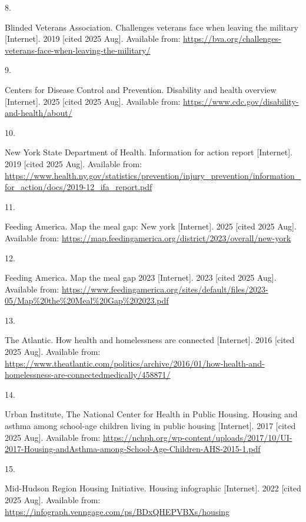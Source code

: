 \documentclass[
  english,
  letterpaper,
]{report}
\newlength{\cslhangindent}
\newlength{\csllabelwidth}
\newenvironment{CSLReferences}[2] %
 {\begin{list}{}{%
  \setlength{\itemindent}{0pt}
  \setlength{\leftmargin}{0pt}
  \setlength{\parsep}{0pt}
  \ifodd #1
   \setlength{\leftmargin}{\cslhangindent}
   \setlength{\itemindent}{-1\cslhangindent}
  \fi
  \setlength{\itemsep}{#2\baselineskip}}}
 {\end{list}}
\newcommand{\CSLLeftMargin}[1]{\parbox[t]{\csllabelwidth}{\strut#1\strut}}
\newcommand{\CSLRightInline}[1]{\parbox[t]{\linewidth - \csllabelwidth}{\strut#1\strut}}
\begin{document}
\begin{CSLReferences}{0}{1}
\CSLLeftMargin{8. }%
\CSLRightInline{Blinded Veterans Association. Challenges veterans face
when leaving the military {[}Internet{]}. 2019 {[}cited 2025 Aug{]}.
Available from:
\url{https://bva.org/challenges-veterans-face-when-leaving-the-military/}}

\CSLLeftMargin{9. }%
\CSLRightInline{Centers for Disease Control and Prevention. Disability
and health overview {[}Internet{]}. 2025 {[}cited 2025 Aug{]}. Available
from: \url{https://www.cdc.gov/disability-and-health/about/}}

\CSLLeftMargin{10. }%
\CSLRightInline{New York State Department of Health. Information for
action report {[}Internet{]}. 2019 {[}cited 2025 Aug{]}. Available from:
\url{https://www.health.ny.gov/statistics/prevention/injury_prevention/information_for_action/docs/2019-12_ifa_report.pdf}}

\CSLLeftMargin{11. }%
\CSLRightInline{Feeding America. Map the meal gap: New york
{[}Internet{]}. 2025 {[}cited 2025 Aug{]}. Available from:
\url{https://map.feedingamerica.org/district/2023/overall/new-york}}

\CSLLeftMargin{12. }%
\CSLRightInline{Feeding America. Map the meal gap 2023 {[}Internet{]}.
2023 {[}cited 2025 Aug{]}. Available from:
\url{https://www.feedingamerica.org/sites/default/files/2023-05/Map\%20the\%20Meal\%20Gap\%202023.pdf}}

\CSLLeftMargin{13. }%
\CSLRightInline{The Atlantic. How health and homelessness are connected
{[}Internet{]}. 2016 {[}cited 2025 Aug{]}. Available from:
\url{https://www.theatlantic.com/politics/archive/2016/01/how-health-and-homelessness-are-connectedmedically/458871/}}

\CSLLeftMargin{14. }%
\CSLRightInline{Urban Institute, The National Center for Health in
Public Housing. Housing and asthma among school-age children living in
public housing {[}Internet{]}. 2017 {[}cited 2025 Aug{]}. Available
from:
\url{https://nchph.org/wp-content/uploads/2017/10/UI-2017-Housing-andAsthma-among-School-Age-Children-AHS-2015-1.pdf}}

\CSLLeftMargin{15. }%
\CSLRightInline{Mid-Hudson Region Housing Initiative. Housing
infographic {[}Internet{]}. 2022 {[}cited 2025 Aug{]}. Available from:
\url{https://infograph.venngage.com/ps/BDxQHEPVBXs/housing}}


\end{CSLReferences}
\end{document}
